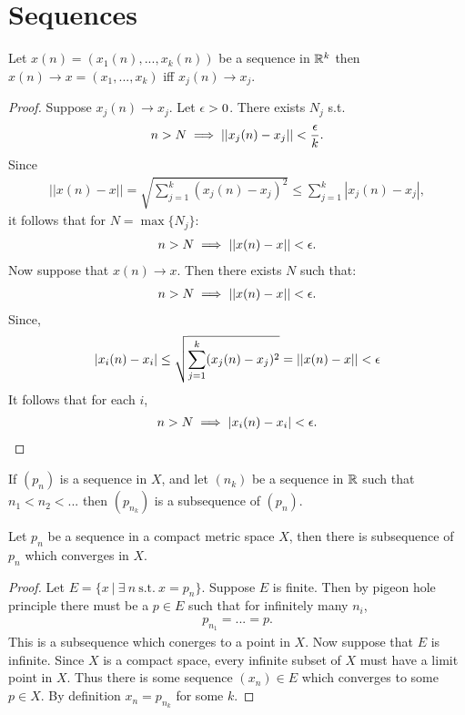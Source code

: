 \section{Sequences}
\begin{proposition}
  Let $x(n) = (x_1(n),...,x_k(n))$ be a sequence in $\mathbb{R}^k$ then $x(n)\to x=(x_1,...,x_k)$ iff $x_j(n) \to x_j$.
\end{proposition}
\begin{proof}
  Suppose $x_j(n) \to x_j$. Let $\epsilon>0$. There exists $N_j$ s.t.
  \begin{align*}
    n>N \implies ||x_j(n) - x_j|| < \frac{\epsilon}{k}.
  \end{align*}
  Since
  \begin{align*}
    ||x(n) - x|| = \sqrt{\sum_{j=1}^k (x_j(n) - x_j)^2} \leq \sum_{j=1}^k |x_j(n) - x_j|,
  \end{align*}
  it follows that for $N = \max\{N_j\}$:
  \begin{align*}
    n>N \implies ||x(n) - x|| <\epsilon.
  \end{align*}
  Now suppose that $x(n) \to x$. Then there exists $N$ such that:
  \begin{align*}
    n>N \implies ||x(n) -x|| < \epsilon.
  \end{align*}
  Since,
  \begin{align*}
    |x_i(n) - x_i| \leq \sqrt{\sum_{j=1}^k (x_j(n) - x_j)^2} = ||x(n) - x|| <\epsilon
  \end{align*}
  It follows that for each $i$,
  \begin{align*}
    n>N \implies |x_i(n) - x_i| < \epsilon.
  \end{align*}
\end{proof}
\begin{definition}
  If $(p_n)$ is a sequence in $X$, and let $(n_k)$ be a sequence in $\mathbb{R}$ such that $n_1<n_2<...$ then $(p_{n_k})$ is a subsequence of $(p_n)$.
\end{definition}
\begin{theorem}
  Let $p_n$ be a sequence in a compact metric space $X$, then there is subsequence of $p_n$ which converges in $X$.
\end{theorem}
\begin{proof}
  Let $E = \{x\ |\ \exists\ n\ \text{s.t.}\ x=p_n\}$. Suppose $E$ is finite. Then by pigeon hole principle there must be a $p\in E$ such that for infinitely many $n_i$,
  \begin{align*}
    p_{n_1} = ... = p.
  \end{align*}
  This is a subsequence which conerges to a point in $X$. Now suppose that $E$ is infinite. Since $X$ is a compact space, every infinite subset of $X$ must have a limit point in $X$. Thus there is some sequence $(x_n) \in E$ which converges to some $p\in X$. By definition $x_n = p_{n_{k}}$ for some $k$. 
\end{proof}

